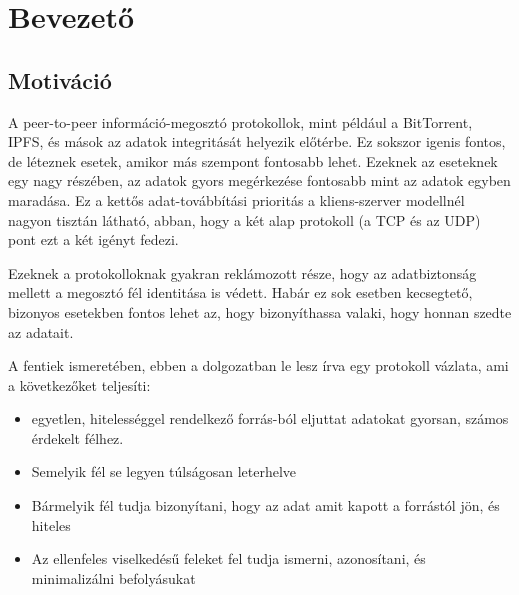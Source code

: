 \chapter{Bevezet\H{o}}\label{ch:BEV}

\section{Motiváció}\label{sec:BEV:mot}

A peer-to-peer információ-megosztó protokollok,
mint például a BitTorrent, IPFS, és mások az
adatok integritását helyezik előtérbe. Ez
sokszor igenis fontos, de léteznek esetek,
amikor más szempont fontosabb lehet. Ezeknek az
eseteknek egy nagy részében, az adatok gyors
megérkezése fontosabb mint az adatok egyben
maradása. Ez a kettős adat-továbbítási
prioritás a kliens-szerver modellnél nagyon
tisztán látható, abban, hogy a két alap
protokoll (a TCP és az UDP) pont ezt a két
igényt fedezi.

Ezeknek a protokolloknak gyakran reklámozott
része, hogy az adatbiztonság mellett a megosztó
fél identitása is védett. Habár ez sok esetben
kecsegtető, bizonyos esetekben fontos lehet az,
hogy bizonyíthassa valaki, hogy honnan szedte az
adatait.

A fentiek ismeretében, ebben a dolgozatban le
lesz írva egy protokoll vázlata, ami a
következőket teljesíti:
\begin{itemize}
\item egyetlen, hitelességgel rendelkező
forrás-ból eljuttat adatokat gyorsan, számos
érdekelt félhez.
\item Semelyik fél se legyen túlságosan
leterhelve
\item Bármelyik fél tudja bizonyítani, hogy az
adat amit kapott a forrástól jön, és hiteles
\item Az ellenfeles viselkedésű feleket fel
tudja ismerni, azonosítani, és minimalizálni
befolyásukat
\end{itemize}

